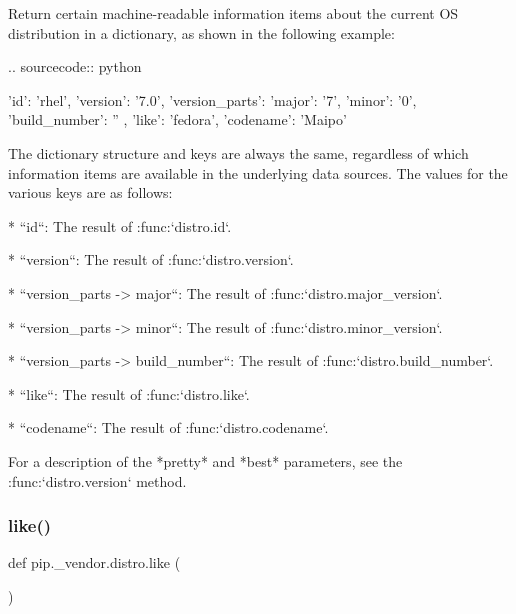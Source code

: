 \begin{DoxyVerb}Return certain machine-readable information items about the current OS
distribution in a dictionary, as shown in the following example:

.. sourcecode:: python

    {
        'id': 'rhel',
        'version': '7.0',
        'version_parts': {
            'major': '7',
            'minor': '0',
            'build_number': ''
        },
        'like': 'fedora',
        'codename': 'Maipo'
    }

The dictionary structure and keys are always the same, regardless of which
information items are available in the underlying data sources. The values
for the various keys are as follows:

* ``id``:  The result of :func:`distro.id`.

* ``version``:  The result of :func:`distro.version`.

* ``version_parts -> major``:  The result of :func:`distro.major_version`.

* ``version_parts -> minor``:  The result of :func:`distro.minor_version`.

* ``version_parts -> build_number``:  The result of
  :func:`distro.build_number`.

* ``like``:  The result of :func:`distro.like`.

* ``codename``:  The result of :func:`distro.codename`.

For a description of the *pretty* and *best* parameters, see the
:func:`distro.version` method.
\end{DoxyVerb}
 \mbox{\label{namespacepip_1_1__vendor_1_1distro_afe2ac4116a69f742b9db939150a331a8}} 
\subsubsection{\texorpdfstring{like()}{like()}}
{\footnotesize\ttfamily def pip.\+\_\+vendor.\+distro.\+like (\begin{DoxyParamCaption}{ }\end{DoxyParamCaption})}

